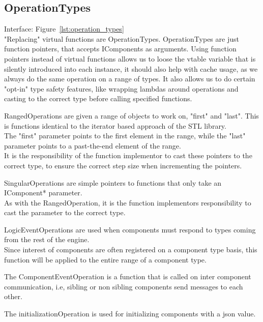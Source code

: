 \subsection{OperationTypes}
Interface: Figure~\ref{lst:operation_types}\\\noindent
"Replacing" virtual functions are OperationTypes.
OperationTypes are just function pointers, that accepts IComponents as arguments.
Using function pointers instead of virtual functions allows us to loose
the vtable variable that is silently introduced into each instance,
it should also help with cache usage, as we always do the same operation on a range of types.
It also allows us to do certain "opt-in" type safety features,
like wrapping lambdas around operations and casting to the correct type before calling specified functions.

RangedOperations are given a range of objects to work on, "first" and "last".
This is functions identical to the iterator based approach of the STL library.\\
The "first" parameter points to the first element in the range, while the "last" parameter points to a past-the-end element of the range.\\
It is the responsibility of the function implementor to cast these pointers to the correct type, 
to ensure the correct step size when incrementing the pointers.

SingularOperations are simple pointers to functions that only take an IComponent* parameter.\\
As with the RangedOperation, it is the function implementors responsibility to cast the parameter to the correct type.

LogicEventOperations are used when components must respond to types coming from the rest of the engine.\\
Since interest of components are often registered on a component type basis,
this function will be applied to the entire range of a component type.

The ComponentEventOperation is a function that is called on inter component communication, i.e, 
sibling or non sibling components send messages to each other.

The initializationOperation is used for initializing components with a json value.

